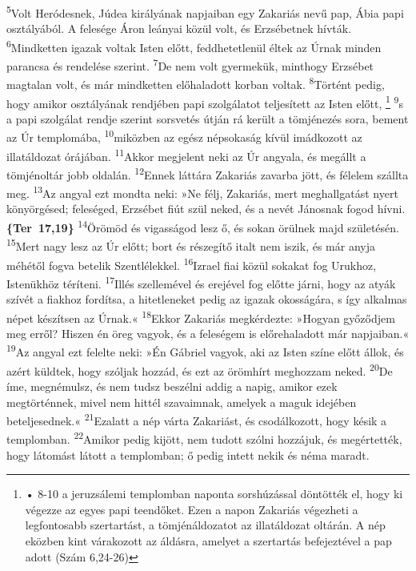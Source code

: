 \documentclass[10pt]{article}
\begin{document}
\begin{multicols}{2}
\textsuperscript{5}Volt Heródesnek, Júdea királyának napjaiban egy Zakariás nevű pap, Ábia papi osztályából.
 A felesége Áron leányai közül volt, és Erzsébetnek hívták.
\textsuperscript{6}Mindketten igazak voltak Isten előtt, feddhetetlenül éltek az Úrnak minden parancsa és rendelése szerint.
\textsuperscript{7}De nem volt gyermekük, minthogy Erzsébet magtalan volt, és már mindketten előhaladott korban voltak.
\textsuperscript{8}Történt pedig, hogy amikor osztályának rendjében papi szolgálatot teljesített az Isten előtt,
 \let\thefootnote\relax\footnote{• 8-10 a jeruzsálemi templomban naponta sorshúzással döntötték el, hogy ki végezze az egyes papi teendőket. Ezen a napon Zakariás végezheti a legfontosabb szertartást, a tömjénáldozatot az illatáldozat oltárán.
A nép eközben kint várakozott az áldásra, amelyet a szertartás befejeztével a pap adott (Szám 6,24-26)}
\textsuperscript{9}s a papi szolgálat rendje szerint sorsvetés útján rá került a tömjénezés sora, bement az Úr templomába,
\textsuperscript{10}miközben az egész népsokaság kívül imádkozott az illatáldozat órájában.
\textsuperscript{11}Akkor megjelent neki az Úr angyala, és megállt a tömjénoltár jobb oldalán.
\textsuperscript{12}Ennek láttára Zakariás zavarba jött, és félelem szállta meg.
\textsuperscript{13}Az angyal ezt mondta neki: »Ne félj, Zakariás, mert meghallgatást nyert könyörgésed; feleséged, Erzsébet fiút szül neked, és a nevét Jánosnak fogod hívni. { \footnotesize\textbf{\{Ter~17,19\}}}
\textsuperscript{14}Örömöd és vigasságod lesz ő, és sokan örülnek majd születésén.
\textsuperscript{15}Mert nagy lesz az Úr előtt; bort és részegítő italt nem iszik, és már anyja méhétől fogva betelik Szentlélekkel.
\textsuperscript{16}Izrael fiai közül sokakat fog Urukhoz, Istenükhöz téríteni.
\textsuperscript{17}Illés szellemével és erejével fog előtte járni, hogy az atyák szívét a fiakhoz fordítsa, a hitetleneket pedig az igazak okosságára, s így alkalmas népet készítsen az Úrnak.«
\textsuperscript{18}Ekkor Zakariás megkérdezte: »Hogyan győződjem meg erről? Hiszen én öreg vagyok, és a feleségem is előrehaladott már napjaiban.«
\textsuperscript{19}Az angyal ezt felelte neki: »Én Gábriel vagyok, aki az Isten színe előtt állok, és azért küldtek, hogy szóljak hozzád, és ezt az örömhírt meghozzam neked.
\textsuperscript{20}De íme, megnémulsz, és nem tudsz beszélni addig a napig, amikor ezek megtörténnek, mivel nem hittél szavaimnak, amelyek a maguk idejében beteljesednek.«
\textsuperscript{21}Ezalatt a nép várta Zakariást, és csodálkozott, hogy késik a templomban.
\textsuperscript{22}Amikor pedig kijött, nem tudott szólni hozzájuk, és megértették, hogy látomást látott a templomban; ő pedig intett nekik és néma maradt.


\end{multicols}
\end{document}
